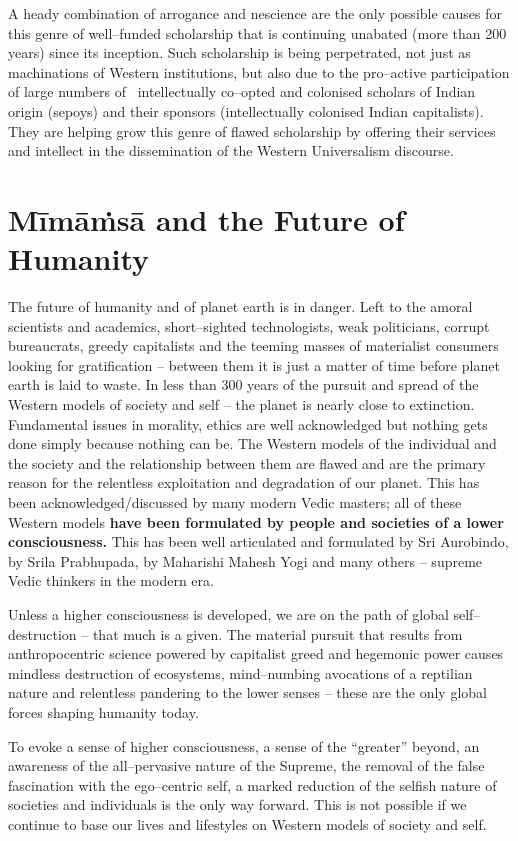 A heady combination of arrogance and nescience are the only possible causes for this genre of well–funded scholarship that is continuing unabated (more than 200 years) since its inception. Such scholarship is being perpetrated, not just as machinations of Western institutions, but also due to the pro–active participation of large numbers of  intellectually co–opted and colonised scholars of Indian origin (sepoys) and their sponsors (intellectually colonised Indian capitalists). They are helping grow this genre of flawed scholarship by offering their services and intellect in the dissemination of the Western Universalism discourse.


\section*{Mīmāṁsā and the Future of Humanity}

The future of humanity and of planet earth is in danger. Left to the amoral scientists and academics, short–sighted technologists, weak politicians, corrupt bureaucrats, greedy capitalists and the teeming masses of materialist consumers looking for gratification – between them it is just a matter of time before planet earth is laid to waste. In less than 300 years of the pursuit and spread of the Western models of society and self – the planet is nearly close to extinction. Fundamental issues in morality, ethics are well acknowledged but nothing gets done simply because nothing can be. The Western models of the individual and the society and the relationship between them are flawed and are the primary reason for the relentless exploitation and degradation of our planet. This has been acknowledged/discussed by many modern Vedic masters; all of these Western models \textbf{have been formulated by people and societies of a lower consciousness.} This has been well articulated and formulated by Sri Aurobindo, by Srila Prabhupada, by Maharishi Mahesh Yogi and many others – supreme Vedic thinkers in the modern era.

Unless a higher consciousness is developed, we are on the path of global self–destruction – that much is a given. The material pursuit that results from anthropocentric science powered by capitalist greed and hegemonic power causes mindless destruction of ecosystems, mind–numbing avocations of a reptilian nature and relentless pandering to the lower senses – these are the only global forces shaping humanity today.

To evoke a sense of higher consciousness, a sense of the “greater” beyond, an awareness of the all–pervasive nature of the Supreme, the removal of the false fascination with the ego–centric self, a marked reduction of the selfish nature of societies and individuals is the only way forward. This is not possible if we continue to base our lives and lifestyles on Western models of society and self.

